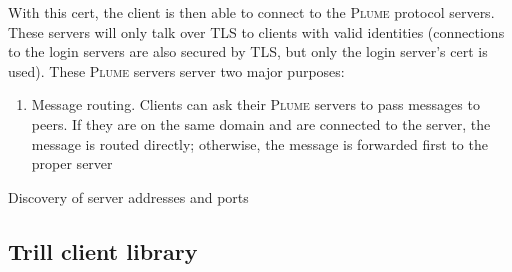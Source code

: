 \documentclass[11pt]{article}
\newcommand{\Plume}{\textsc{Plume}\xspace}
\begin{document}
With this cert, the client is then able to connect to the \Plume protocol
servers.  These servers will only talk over TLS to clients with valid
identities (connections to the login servers are also secured by TLS, but only
the login server's cert is used).  These \Plume servers server two major
purposes:

\begin{enumerate}
  \item Message routing.  Clients can ask their \Plume servers to pass messages
    to peers.  If they are on the same domain and are connected to the server,
    the message is routed directly; otherwise, the message is forwarded first
    to the proper server
\end{enumerate}

Discovery of server addresses and ports

\subsection{Trill client library}
\end{document}
